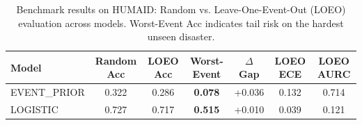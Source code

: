 \begin{table}[t]
\centering
\caption{Benchmark results on HUMAID: Random vs. Leave-One-Event-Out (LOEO) evaluation across models. Worst-Event Acc indicates tail risk on the hardest unseen disaster.}
\label{tab:benchmark_humaid}
\begin{tabular}{lcccccc}
\toprule
\textbf{Model} & \textbf{Random Acc} & \textbf{LOEO Acc} & \textbf{Worst-Event} & $\Delta$ \textbf{Gap} & \textbf{LOEO ECE} & \textbf{LOEO AURC} \\
\midrule
EVENT_PRIOR & 0.322 & 0.286 & \textbf{0.078} & +0.036 & 0.132 & 0.714 \\
LOGISTIC & 0.727 & 0.717 & \textbf{0.515} & +0.010 & 0.039 & 0.121 \\
\bottomrule
\end{tabular}
\end{table}
